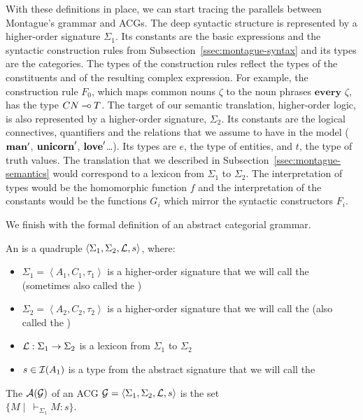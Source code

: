 With these definitions in place, we can start tracing the parallels between
Montague's grammar and ACGs. The deep syntactic structure is represented by
a higher-order signature $\Sigma_1$. Its constants are the basic
expressions and the syntactic construction rules from
Subsection~\ref{ssec:montague-syntax} and its types are the categories. The
types of the construction rules reflect the types of the constituents and
of the resulting complex expression. For example, the construction rule
$F_0$, which maps common nouns $\zeta$ to the noun phrases
$\textbf{every }\zeta$, has the type $CN \mathbin{{-}\mkern-3.5mu{\circ}} T$. The target of our
semantic translation, higher-order logic, is also represented by a
higher-order signature, $\Sigma_2$. Its constants are the logical
connectives, quantifiers and the relations that we assume to have in the
model ($\textbf{man}'$, $\textbf{unicorn}'$, $\textbf{love}'$\ldots). Its types are
$e$, the type of entities, and $t$, the type of truth values. The
translation that we described in Subsection~\ref{ssec:montague-semantics}
would correspond to a lexicon from $\Sigma_1$ to $\Sigma_2$. The
interpretation of types would be the homomorphic function $f$ and the
interpretation of the constants would be the functions $G_i$ which mirror
the syntactic constructors $F_i$.

We finish with the formal definition of an abstract categorial grammar.

\begin{definition}
  An  is a quadruple $\left< \Sigma_1,
    \Sigma_2, \mathcal{L}, s \right>$, where:

  \begin{itemize}
  \item $\Sigma_1 = \left< A_1, C_1, \tau_1 \right>$ is a higher-order
    signature that we will call the  (sometimes
    also called the )
  \item $\Sigma_2 = \left< A_2, C_2, \tau_2 \right>$ is a higher-order
    signature that we will call the  (also called
    the )
  \item $\mathcal{L} : \Sigma_1 \to \Sigma_2$ is a lexicon from $\Sigma_1$ to
    $\Sigma_2$
  \item $s \in \mathcal{I}(A_1)$ is a type from the abstract signature that we will
    call the 
  \end{itemize}
\end{definition}

\begin{definition}
  The  $\mathcal{A}(\mathcal{G})$ of an ACG
  $\mathcal{G} = \left< \Sigma_1, \Sigma_2, \mathcal{L}, s \right>$ is the set \\
  $\{ M \mid \ \vdash_{\Sigma_1} M : s \}$.
\end{definition}

